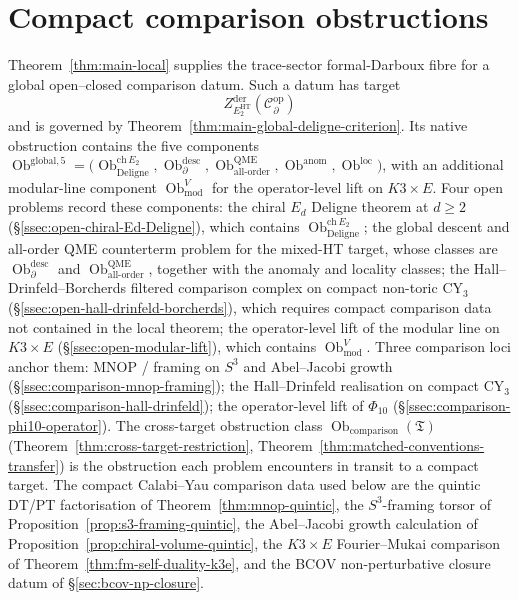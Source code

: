 \section{Compact comparison obstructions}\label{sec:compact-comparison-obstructions-notes}

Theorem~\ref{thm:main-local} supplies the trace-sector
formal-Darboux fibre for a global open--closed comparison datum.  Such
a datum has target
\[
  Z^{\mathrm{der}}_{E_2^{\mathrm{HT}}}\!
  (\mathcal C^{\mathrm{op}}_\partial)
\]
and is governed by Theorem~\ref{thm:main-global-deligne-criterion}.
Its native obstruction contains the five components
$\operatorname{Ob}^{\mathrm{global},5}=
\bigl(
\operatorname{Ob}^{\mathrm{ch}\,E_2}_{\mathrm{Deligne}},
\operatorname{Ob}^{\mathrm{desc}}_{\partial},
\operatorname{Ob}^{\mathrm{QME}}_{\mathrm{all\mbox{-}order}},
\operatorname{Ob}^{\mathrm{anom}},
\operatorname{Ob}^{\mathrm{loc}}
\bigr)$, with
an additional modular-line component $\operatorname{Ob}^V_{\mathrm{mod}}$
for the operator-level lift on $K3\times E$.  Four open problems
record these components: the chiral $E_d$ Deligne theorem at $d\geq 2$
(\S\ref{ssec:open-chiral-Ed-Deligne}), which contains
$\operatorname{Ob}^{\mathrm{ch}\,E_2}_{\mathrm{Deligne}}$; the global
descent and all-order QME counterterm problem for the mixed-HT target,
whose classes
are \(\operatorname{Ob}^{\mathrm{desc}}_{\partial}\) and
\(\operatorname{Ob}^{\mathrm{QME}}_{\mathrm{all\mbox{-}order}}\), together
with the anomaly and locality classes; the
Hall--Drinfeld--Borcherds filtered comparison complex on compact
non-toric CY$_3$ (\S\ref{ssec:open-hall-drinfeld-borcherds}), which
requires compact comparison data not contained in the local theorem;
the operator-level lift
of the modular line on $K3\times E$
(\S\ref{ssec:open-modular-lift}), which contains
$\operatorname{Ob}^V_{\mathrm{mod}}$.  Three comparison loci anchor them:
MNOP / framing on $S^3$ and Abel--Jacobi growth
(\S\ref{ssec:comparison-mnop-framing}); the
Hall--Drinfeld realisation on compact CY$_3$
(\S\ref{ssec:comparison-hall-drinfeld}); the operator-level lift of
$\Phi_{10}$ (\S\ref{ssec:comparison-phi10-operator}).  The
cross-target obstruction class
$\operatorname{Ob}_{\mathrm{comparison}}(\mathfrak T)$
(Theorem~\ref{thm:cross-target-restriction},
Theorem~\ref{thm:matched-conventions-transfer}) is the obstruction
each problem encounters in transit to a compact target.  The compact
Calabi--Yau comparison data used below are the quintic DT/PT
factorisation of Theorem~\ref{thm:mnop-quintic}, the \(S^3\)-framing
torsor of Proposition~\ref{prop:s3-framing-quintic}, the Abel--Jacobi
growth calculation of Proposition~\ref{prop:chiral-volume-quintic}, the
\(K3\times E\) Fourier--Mukai comparison of
Theorem~\ref{thm:fm-self-duality-k3e}, and the BCOV non-perturbative
closure datum of \S\ref{sec:bcov-np-closure}.

